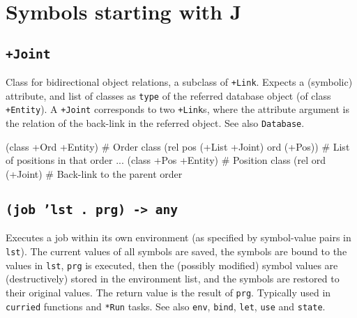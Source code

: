 %
%
%



\chapter{Symbols starting with J}
\label{cha:func-ref-J-functions-starting-with-J}
 
\section*{\texttt{+Joint}}
\label{sec:func-ref-J-+Joint}


Class for bidirectional object relations, a subclass of \texttt{+Link}. Expects
a (symbolic) attribute, and list of classes as \texttt{type} of the referred
database object (of class \texttt{+Entity}). A \texttt{+Joint} corresponds to two
\texttt{+Link}s, where the attribute argument is the relation of the back-link in the referred object. See also \texttt{Database}.


\begin{wideverbatim}
(class +Ord +Entity)                   # Order class
(rel pos (+List +Joint) ord (+Pos))    # List of positions in that order
...
(class +Pos +Entity)    # Position class
(rel ord (+Joint)       # Back-link to the parent order
\end{wideverbatim}

 
\section*{\texttt{(job 'lst . prg) -> any}}
\label{sec:func-ref-J-(job 'lst . prg) -> any}


Executes a job within its own environment (as specified by symbol-value
pairs in \texttt{lst}). The current values of all symbols are saved, the
symbols are bound to the values in \texttt{lst}, \texttt{prg} is executed, then the
(possibly modified) symbol values are (destructively) stored in the
environment list, and the symbols are restored to their original values.
The return value is the result of \texttt{prg}. Typically used in \texttt{curried}
functions and \texttt{*Run} tasks. See also \texttt{env}, \texttt{bind}, \texttt{let}, \texttt{use} and
\texttt{state}.


